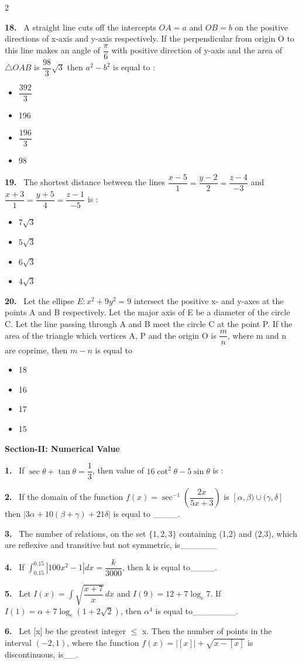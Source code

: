 \documentclass[10pt]{extarticle}
\newcommand{\sect}[1]{\par\smallskip\noindent\textbf{#1}\par}
\newcommand{\qn}[1]{\par\smallskip\noindent\textbf{#1.}~}
\newenvironment{qoptions}{\begin{itemize}[leftmargin=1.8em,itemsep=1pt,topsep=2pt,label={}]}{\end{itemize}}
\newcommand{\opt}[2]{\item[(#1)] #2}
\begin{document}
\begin{multicols}{2}
\qn{18} A straight line cuts off the intercepts $OA=a$ and $OB=b$ on the positive directions of x-axis and y-axis respectively. If the perpendicular from origin O to this line makes an angle of $\dfrac\pi6$ with positive direction of y-axis and the area of $\triangle OAB$ is $\dfrac{98}{3}\sqrt3$ then $a^2-b^2$ is equal to :
\begin{qoptions}
\opt{A}{$\dfrac{392}{3}$}
\opt{B}{196}
\opt{C}{$\dfrac{196}{3}$}
\opt{D}{98}
\end{qoptions}

\qn{19} The shortest distance between the lines $\dfrac{x-5}{1}=\dfrac{y-2}{2}=\dfrac{z-4}{-3}$ and $\dfrac{x+3}{1}=\dfrac{y+5}{4}=\dfrac{z-1}{-5}$ is :
\begin{qoptions}
\opt{A}{$7\sqrt3$}
\opt{B}{$5\sqrt3$}
\opt{C}{$6\sqrt3$}
\opt{D}{$4\sqrt3$}
\end{qoptions}

\qn{20} Let the ellipse $E:x^2+9y^2=9$ intersect the positive x- and y-axes at the points A and B respectively. Let the major axis of E be a diameter of the circle C. Let the line passing through A and B meet the circle C at the point P. If the area of the triangle which vertices A, P and the origin O is $\dfrac mn$, where m and n are coprime, then $m-n$ is equal to
\begin{qoptions}
\opt{A}{18}
\opt{B}{16}
\opt{C}{17}
\opt{D}{15}
\end{qoptions}

\sect{Section-II: Numerical Value}

\qn{1} If $\sec\theta+\tan\theta=\dfrac13$, then value of $16\cot^2\theta-5\sin\theta$ is :

\qn{2} If the domain of the function $f(x)=\sec^{-1}\left(\dfrac{2x}{5x+3}\right)$ is $[\alpha,\beta)\cup(\gamma,\delta]$ then $|3\alpha+10(\beta+\gamma)+21\delta|$ is equal to \_\_\_\_.

\qn{3} The number of relations, on the set $\{1,2,3\}$ containing (1,2) and (2,3), which are reflexive and transitive but not symmetric, is\_\_\_\_\_\_

\qn{4} If $\displaystyle\int_{0.15}^{0.15}\left|100x^2-1\right|dx=\dfrac{k}{3000}$, then k is equal to\_\_\_\_.

\qn{5} Let $I(x)=\displaystyle\int\sqrt{\dfrac{x+7}{x}}\,dx$ and $I(9)=12+7\log_e7$. If $I(1)=\alpha+7\log_e\left(1+2\sqrt2\right)$, then $\alpha^4$ is equal to\_\_\_\_\_\_\_.

\qn{6} Let [x] be the greatest integer $\le$ x. Then the number of points in the interval $(-2,1)$, where the function $f(x)=|[x]|+\sqrt{x-[x]}$ is discontinuous, is\_\_.


\end{multicols}
\end{document}
